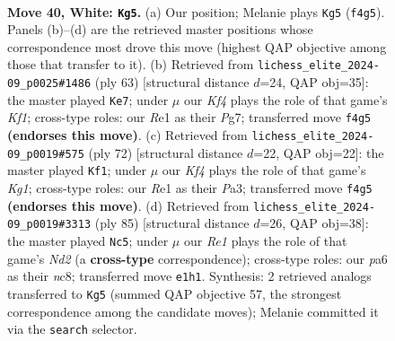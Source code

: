 \documentclass[11pt]{article}
\begin{document}
\clearpage

\begin{figure}[p]\centering
\begin{subfigure}{0.46\textwidth}\centering
\resizebox{\linewidth}{!}{%
\newchessgame
\chessboard[
  setfen={1r6/1p3pk1/p3p3/8/P3PK2/5P1P/1R5P/4R3 w - - 9 40},
  showmover=false,
  pgfstyle=straightmove, color=movearrow, markmove={f4-g5}
]}
\caption{}
\end{subfigure}\hfill
\begin{subfigure}{0.46\textwidth}\centering
\resizebox{\linewidth}{!}{%
\newchessgame
\chessboard[
  setfen={2r2k2/pp3pp1/4p3/6pP/P1P3P1/8/5P2/2R2K2 b - - 4 32},
  showmover=false,
  pgfstyle=straightmove, color=movearrow, markmove={f8-e7}
]}
\caption{}
\end{subfigure}
\\[4pt]
\begin{subfigure}{0.46\textwidth}\centering
\resizebox{\linewidth}{!}{%
\newchessgame
\chessboard[
  setfen={5k2/1p3p2/p7/8/3rp1R1/P5Pp/1P3P1P/6K1 w - - 0 37},
  showmover=false,
  pgfstyle=straightmove, color=movearrow, markmove={g1-f1}
]}
\caption{}
\end{subfigure}\hfill
\begin{subfigure}{0.46\textwidth}\centering
\resizebox{\linewidth}{!}{%
\newchessgame
\chessboard[
  setfen={2N5/1p1n1pk1/6p1/1p6/8/P5P1/1r3PKP/4R3 b - - 0 43},
  showmover=false,
  pgfstyle=straightmove, color=movearrow, markmove={d7-c5}
]}
\caption{}
\end{subfigure}
\caption{\textbf{Move 40, White: \texttt{Kg5}.} (a) Our position; Melanie plays \texttt{Kg5} (\texttt{f4g5}). Panels (b)--(d) are the retrieved master positions whose correspondence most drove this move (highest QAP objective among those that transfer to it). (b) Retrieved from \texttt{lichess\_elite\_2024-09\_p0025\#1486} (ply 63) [structural distance $d$=24, QAP obj=35]: the master played \texttt{Ke7}; under $\mu$ our \emph{Kf4} plays the role of that game's \emph{Kf1}; cross-type roles: our \emph{R}e1 as their \emph{P}g7; transferred move \texttt{f4g5} \textbf{(endorses this move)}. (c) Retrieved from \texttt{lichess\_elite\_2024-09\_p0019\#575} (ply 72) [structural distance $d$=22, QAP obj=22]: the master played \texttt{Kf1}; under $\mu$ our \emph{Kf4} plays the role of that game's \emph{Kg1}; cross-type roles: our \emph{R}e1 as their \emph{P}a3; transferred move \texttt{f4g5} \textbf{(endorses this move)}. (d) Retrieved from \texttt{lichess\_elite\_2024-09\_p0019\#3313} (ply 85) [structural distance $d$=26, QAP obj=38]: the master played \texttt{Nc5}; under $\mu$ our \emph{Re1} plays the role of that game's \emph{Nd2} (a \textbf{cross-type} correspondence); cross-type roles: our \emph{p}a6 as their \emph{n}c8; transferred move \texttt{e1h1}. Synthesis: 2 retrieved analogs transferred to \texttt{Kg5} (summed QAP objective 57, the strongest correspondence among the candidate moves); Melanie committed it via the \texttt{search} selector.}
\label{fig:thought-m78}
\end{figure}
\end{document}
